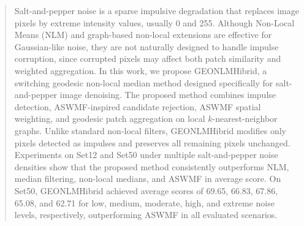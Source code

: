 \documentclass{ieeeaccess}
\begin{document}
\begin{abstract}
Salt-and-pepper noise is a sparse impulsive degradation that replaces image pixels by extreme intensity values, usually 0 and 255. Although Non-Local Means (NLM) and graph-based non-local extensions are effective for Gaussian-like noise, they are not naturally designed to handle impulse corruption, since corrupted pixels may affect both patch similarity and weighted aggregation. In this work, we propose GEONLMHibrid, a switching geodesic non-local median method designed specifically for salt-and-pepper image denoising. The proposed method combines impulse detection, ASWMF-inspired candidate rejection, ASWMF spatial weighting, and geodesic patch aggregation on local $k$-nearest-neighbor graphs. Unlike standard non-local filters, GEONLMHibrid modifies only pixels detected as impulses and preserves all remaining pixels unchanged. Experiments on Set12 and Set50 under multiple salt-and-pepper noise densities show that the proposed method consistently outperforms NLM, median filtering, non-local medians, and ASWMF in average score. On Set50, GEONLMHibrid achieved average scores of 69.65, 66.83, 67.86, 65.08, and 62.71 for low, medium, moderate, high, and extreme noise levels, respectively, outperforming ASWMF in all evaluated scenarios.
\end{abstract}
\end{document}
